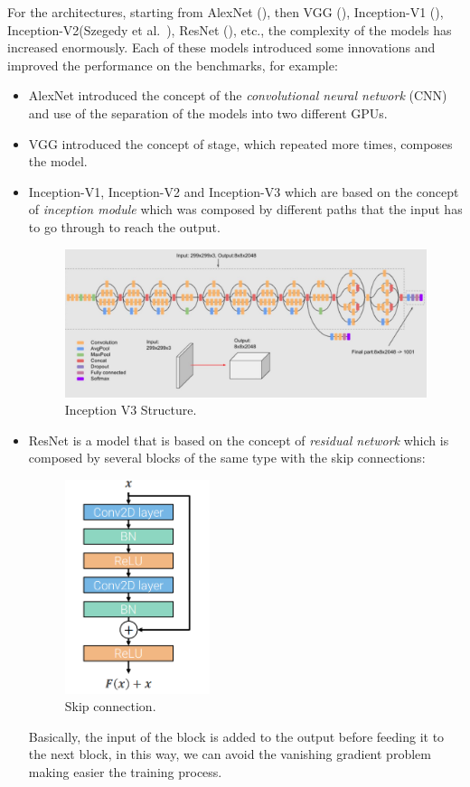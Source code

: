 For the architectures, starting from AlexNet (\cite{alex_net_paper}), then VGG (\cite{vgg_paper}), Inception-V1 (\cite{inception_v1_paper}), Inception-V2(Szegedy et al.~\cite{inception_v2_paper}), ResNet (\cite{resnet_paper}), etc., the complexity of the models has increased enormously.
Each of these models introduced some innovations and improved the performance on the benchmarks, for example:
\begin{itemize}
    \item AlexNet introduced the concept of the \emph{convolutional neural network} (CNN) and use of the separation of the models into two different GPUs.
    \item VGG introduced the concept of stage, which repeated more times, composes the model.
    \item Inception-V1, Inception-V2 and Inception-V3 which are based on the concept of \emph{inception module} which was composed by different paths that the input has to go through to reach the output.
    \begin{figure}[H]
        \centering
        \includegraphics[width=\textwidth]{images/2_inception_v3}
        \caption{Inception V3 Structure.}\label{fig:inception-v3}
    \end{figure}
    \item ResNet is a model that is based on the concept of \emph{residual network} which is composed by several blocks of the same type with the skip connections:
    \begin{figure}[H]
        \centering
        \includegraphics[width=0.4\textwidth]{images/2_1_skip_connection}
        \caption{Skip connection.}\label{fig:skip-connection}
    \end{figure}
    Basically, the input of the block is added to the output before feeding it to the next block, in this way, we can avoid the \gls{vanishing gradient problem} making easier the training process.
\end{itemize}
